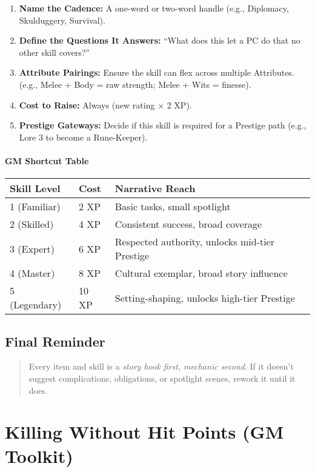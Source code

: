 \documentclass[12pt]{book}
\begin{document}
\begin{enumerate}
  \item \textbf{Name the Cadence:} A one-word or two-word handle (e.g., Diplomacy, Skulduggery, Survival).
  \item \textbf{Define the Questions It Answers:} “What does this let a PC do that no other skill covers?”
  \item \textbf{Attribute Pairings:} Ensure the skill can flex across multiple Attributes. (e.g., Melee + Body = raw strength; Melee + Wits = finesse).
  \item \textbf{Cost to Raise:} Always (new rating × 2 XP).
  \item \textbf{Prestige Gateways:} Decide if this skill is required for a Prestige path (e.g., Lore 3 to become a Rune-Keeper).
\end{enumerate}

\paragraph{GM Shortcut Table}
\begin{tabular}{@{}lll@{}}
\toprule
\textbf{Skill Level} & \textbf{Cost} & \textbf{Narrative Reach} \\
\midrule
1 (Familiar) & 2 XP & Basic tasks, small spotlight \\
2 (Skilled) & 4 XP & Consistent success, broad coverage \\
3 (Expert) & 6 XP & Respected authority, unlocks mid-tier Prestige \\
4 (Master) & 8 XP & Cultural exemplar, broad story influence \\
5 (Legendary) & 10 XP & Setting-shaping, unlocks high-tier Prestige \\
\bottomrule
\end{tabular}

\subsection*{Final Reminder}
\begin{quote}
Every item and skill is a \emph{story hook first, mechanic second}.  
If it doesn’t suggest complications, obligations, or spotlight scenes, rework it until it does.
\end{quote}

\section{Killing Without Hit Points (GM Toolkit)}
\end{document}
